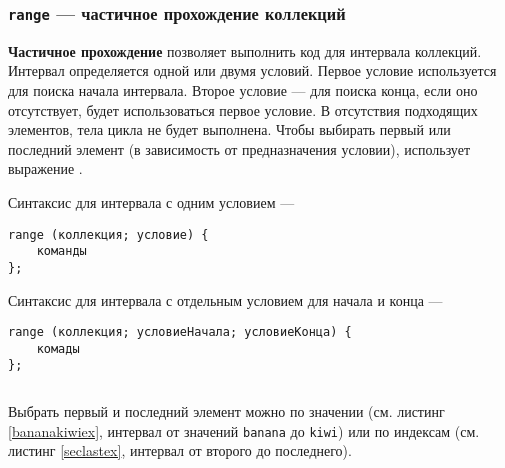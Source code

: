 \begin{sourcecode}
	\label{filterdataex}
    \inputminted[linenos]{icl}{../sources/filterdataex.icL}
\end{sourcecode}

\subsubsection{\texttt{range} — частичное прохождение коллекций}

{\bf Частичное прохождение} позволяет выполнить код для интервала коллекций. Интервал определяется одной или двумя условий. Первое условие используется для поиска начала интервала. Второе условие — для поиска конца, если оно отсутствует, будет использоваться первое условие. В отсутствия подходящих элементов, тела цикла не будет выполнена. Чтобы выбирать первый или последний элемент (в зависимость от предназначения условии), использует выражение \true{}.

Синтаксис для интервала с одним условием —
\begin{verbatim}
range (коллекция; условие) {
	команды
};
\end{verbatim}

Синтаксис для интервала с отдельным условием для начала и конца —
\begin{verbatim}
range (коллекция; условиеНачала; условиеКонца) {
	комады
};
\end{verbatim}

\begin{sourcecode}
	\label{filterindexex}
    \inputminted[linenos]{icl}{../sources/filterindexex.icL}
\end{sourcecode}

Выбрать первый и последний элемент можно по значении (см. листинг \ref{bananakiwiex}, интервал от значений \texttt{banana} до \texttt{kiwi}) или по индексам (см. листинг \ref{seclastex}, интервал от второго до последнего).

\begin{sourcecode}
	\label{bananakiwiex}
    \inputminted[linenos]{icl}{../sources/bananakiwiex.icL}
\end{sourcecode}

\begin{sourcecode}
	\label{seclastex}
    \inputminted[linenos]{icl}{../sources/seclastex.icL}
\end{sourcecode}

